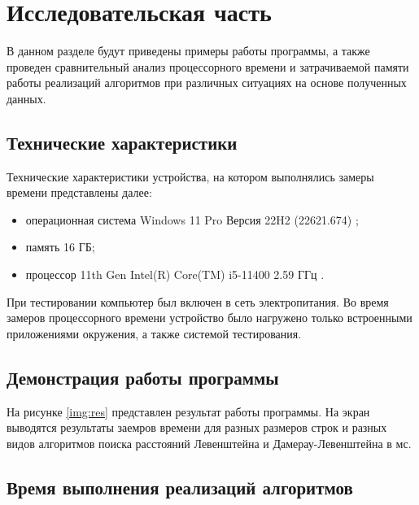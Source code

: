 \chapter{Исследовательская часть}

В данном разделе будут приведены примеры работы программы, а также проведен сравнительный анализ процессорного времени и затрачиваемой памяти работы реализаций алгоритмов при различных ситуациях на основе полученных данных.

\section{Технические характеристики}

Технические характеристики устройства, на котором выполнялись замеры времени представлены далее:

\begin{itemize}
	\item операционная система Windows 11 Pro Версия 22H2 (22621.674) \cite{wind};
	\item память 16 ГБ;
	\item процессор 11th Gen Intel(R) Core(TM) i5-11400 2.59 ГГц \cite{proc}.
\end{itemize}

При тестировании компьютер был включен в сеть электропитания. Во время замеров процессорного времени устройство было нагружено только встроенными приложениями окружения, а также системой тестирования.

\section{Демонстрация работы программы}

На рисунке \ref{img:res} представлен результат работы программы. На экран выводятся результаты заемров времени для разных размеров строк и разных видов алгоритмов поиска расстояний Левенштейна и Дамерау-Левенштейна в мс.
\newpage
%
\begin{center}
	\label{img:res}
\end{center}

\section{Время выполнения реализаций алгоритмов}


